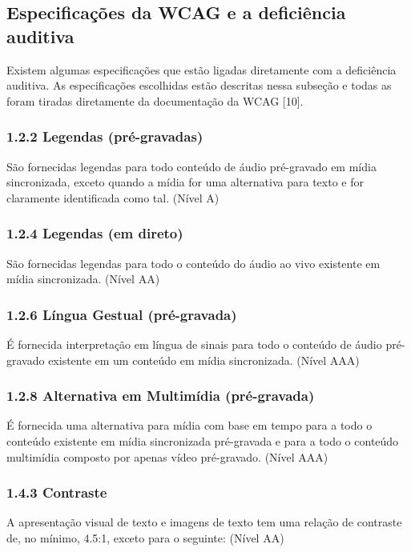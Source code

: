 \documentclass[a4paper]{article}
\begin{document}
\begin{titlepage}
\subsection{Especificações da WCAG e a deficiência auditiva}

Existem algumas especificações que estão ligadas diretamente com a deficiência auditiva. As especificações escolhidas estão descritas nessa subseção e todas as foram tiradas diretamente da documentação da WCAG [10].

\subsubsection{1.2.2 Legendas (pré-gravadas)}

São fornecidas legendas para todo conteúdo de áudio pré-gravado em mídia sincronizada, exceto quando a mídia for uma alternativa para texto e for claramente identificada como tal. (Nível A)

\subsubsection{1.2.4 Legendas (em direto)}

São fornecidas legendas para todo o conteúdo do áudio ao vivo existente em mídia sincronizada. (Nível AA)

\subsubsection{1.2.6 Língua Gestual (pré-gravada)}

É fornecida interpretação em língua de sinais para todo o conteúdo de áudio pré-gravado existente em um conteúdo em mídia sincronizada. (Nível AAA)

\subsubsection{1.2.8 Alternativa em Multimídia (pré-gravada)}

É fornecida uma alternativa para mídia com base em tempo para a todo o conteúdo existente em mídia sincronizada pré-gravada e para a todo o conteúdo multimídia composto por apenas vídeo pré-gravado. (Nível AAA)

\subsubsection{1.4.3 Contraste}

A apresentação visual de texto e imagens de texto tem uma relação de contraste de, no mínimo, 4.5:1, exceto para o seguinte: (Nível AA)\\


\end{titlepage}
\end{document}
